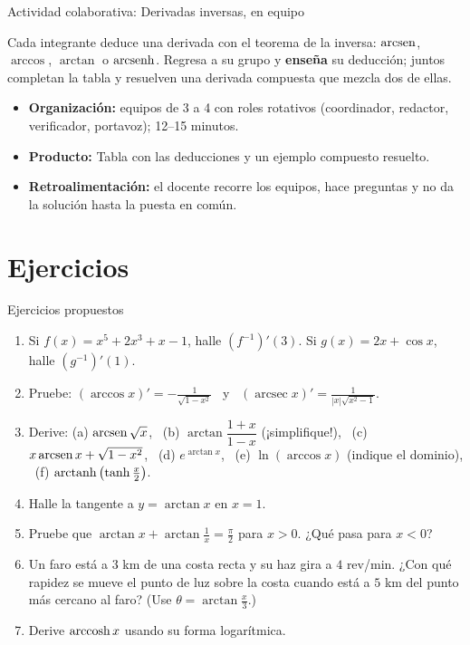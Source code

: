 \documentclass[10pt,aspectratio=169]{beamer}
\begin{document}
\begin{frame}{Actividad colaborativa: Derivadas inversas, en equipo}
  \small
  \begin{activa}
    Cada integrante deduce una derivada con el teorema de la inversa: $\operatorname{arcsen}$, $\arccos$, $\arctan$ o $\operatorname{arcsenh}$. Regresa a su grupo y \textbf{enseña} su deducción; juntos completan la tabla y resuelven una derivada compuesta que mezcla dos de ellas.
  \end{activa}
  \begin{itemize}
    \item \textbf{Organización:} equipos de 3 a 4 con roles rotativos (coordinador, redactor, verificador, portavoz); 12--15 minutos.
    \item \textbf{Producto:} Tabla con las deducciones y un ejemplo compuesto resuelto.
    \item \textbf{Retroalimentación:} el docente recorre los equipos, hace preguntas y no da la solución hasta la puesta en común.
  \end{itemize}
\end{frame}

\section{Ejercicios}

\begin{frame}{Ejercicios propuestos}
  \small
  \begin{ejercicio}
    \begin{enumerate}
      \item Si $f(x)=x^5+2x^3+x-1$, halle $(f^{-1})'(3)$. Si $g(x)=2x+\cos x$, halle $(g^{-1})'(1)$.
      \item Pruebe: $(\arccos x)'=-\frac{1}{\sqrt{1-x^2}}$ \ y \ $(\operatorname{arcsec}x)'=\frac{1}{|x|\sqrt{x^2-1}}$.
      \item Derive: (a) $\operatorname{arcsen}\sqrt{x}$, \ (b) $\arctan\dfrac{1+x}{1-x}$ (¡simplifique!), \ (c) $x\operatorname{arcsen} x+\sqrt{1-x^2}$, \ (d) $e^{\arctan x}$,
        \ (e) $\ln(\arccos x)$ (indique el dominio), \ (f) $\operatorname{arctanh}\left(\tanh\frac x2\right)$.
      \item Halle la tangente a $y=\arctan x$ en $x=1$.
      \item Pruebe que $\arctan x+\arctan\frac1x=\frac\pi2$ para $x>0$. ¿Qué pasa para $x<0$?
      \item Un faro está a $3$ km de una costa recta y su haz gira a $4$ rev/min. ¿Con qué rapidez se mueve el punto de luz sobre la costa cuando
        está a $5$ km del punto más cercano al faro? (Use $\theta=\arctan\frac x3$.)
      \item Derive $\operatorname{arccosh} x$ usando su forma logarítmica.
    \end{enumerate}
  \end{ejercicio}
\end{frame}
\end{document}

